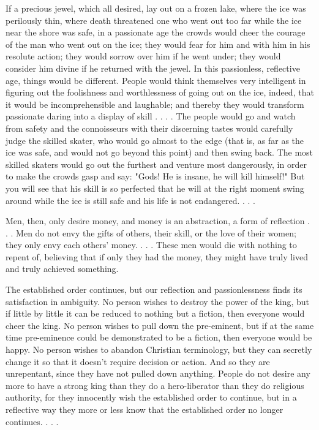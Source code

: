 \documentclass[12pt]{article}
\begin{document}
   If a precious jewel, which all desired, lay out on a frozen lake,
where the ice was perilously thin, where death threatened one who went out
too far while the ice near the shore was safe, in a passionate age the
crowds would cheer the courage of the man who went out on the ice; they
would fear for him and with him in his resolute action; they would sorrow
over him if he went under; they would consider him divine if he returned
with the jewel. In this passionless, reflective age, things would be
different. People would think themselves very intelligent in figuring out
the foolishness and worthlessness of going out on the ice, indeed, that it
would be incomprehensible and laughable; and thereby they would transform
passionate daring into a display of skill . . . . The people would go and
watch from safety and the connoisseurs with their discerning tastes would
carefully judge the skilled skater, who would go almost to the edge (that
is, as far as the ice was safe, and would not go beyond this point) and then
swing back. The most skilled skaters would go out the furthest and venture
most dangerously, in order to make the crowds gasp and say: "Gods! He is
insane, he will kill himself!" But you will see that his skill is so
perfected that he will at the right moment swing around while the ice is
still safe and his life is not endangered. . . .

   Men, then, only desire money, and money is an abstraction, a form of
reflection . . . Men do not envy the gifts of others, their skill, or the
love of their women; they only envy each others' money. . . . These men
would die with nothing to repent of, believing that if only they had the
money, they might have truly lived and truly achieved something.

   The established order continues, but our reflection and
passionlessness finds its satisfaction in ambiguity. No person wishes to
destroy the power of the king, but if little by little it can be reduced to
nothing but a fiction, then everyone would cheer the king. No person wishes
to pull down the pre-eminent, but if at the same time pre-eminence could be
demonstrated to be a fiction, then everyone would be happy. No person wishes
to abandon Christian terminology, but they can secretly change it so that it
doesn't require decision or action. And so they are unrepentant, since they
have not pulled down anything. People do not desire any more to have a
strong king than they do a hero-liberator than they do religious authority,
for they innocently wish the established order to continue, but in a
reflective way they more or less know that the established order no longer
continues. . . .
\end{document}
